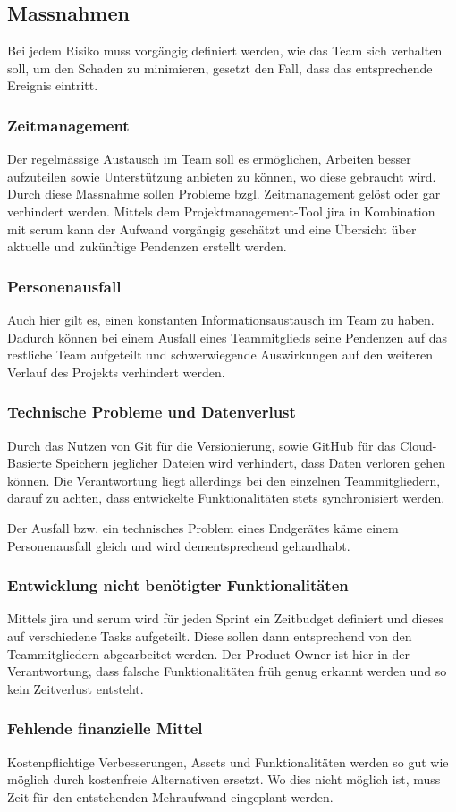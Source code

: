 \documentclass[../main.tex]{subfiles}
\begin{document}
	\subsection{Massnahmen}
	\par Bei jedem Risiko muss vorgängig definiert werden, wie das Team sich verhalten soll, um den Schaden zu minimieren, gesetzt den Fall, dass das entsprechende Ereignis eintritt.
	
	\subsubsection{Zeitmanagement}
	\par Der regelmässige Austausch im Team soll es ermöglichen, Arbeiten besser aufzuteilen sowie Unterstützung anbieten zu können, wo diese gebraucht wird. Durch diese Massnahme sollen Probleme bzgl. Zeitmanagement gelöst oder gar verhindert werden. Mittels dem Projektmanagement-Tool \gls{jira} in Kombination mit \gls{scrum} kann der Aufwand vorgängig geschätzt und eine Übersicht über aktuelle und zukünftige Pendenzen erstellt werden.
	
	\subsubsection{Personenausfall}
	\par Auch hier gilt es, einen konstanten Informationsaustausch im Team zu haben. Dadurch können bei einem Ausfall eines Teammitglieds seine Pendenzen auf das restliche Team aufgeteilt und schwerwiegende Auswirkungen auf den weiteren Verlauf des Projekts verhindert werden.
	
	\subsubsection{Technische Probleme und Datenverlust}
	\par Durch das Nutzen von Git für die Versionierung, sowie GitHub für das Cloud-Basierte Speichern jeglicher Dateien wird verhindert, dass Daten verloren gehen können. Die Verantwortung liegt allerdings bei den einzelnen Teammitgliedern, darauf zu achten, dass entwickelte Funktionalitäten stets synchronisiert werden. 
	\par Der Ausfall bzw. ein technisches Problem eines Endgerätes käme einem Personenausfall gleich und wird dementsprechend gehandhabt.
	
	\subsubsection{Entwicklung nicht benötigter Funktionalitäten}
	\par Mittels \gls{jira} und \gls{scrum} wird für jeden Sprint ein Zeitbudget definiert und dieses auf verschiedene Tasks aufgeteilt. Diese sollen dann entsprechend von den Teammitgliedern abgearbeitet werden.  Der Product Owner ist hier in der Verantwortung, dass falsche Funktionalitäten früh genug erkannt werden und so kein Zeitverlust entsteht.
	
	\subsubsection{Fehlende finanzielle Mittel}
	\par Kostenpflichtige Verbesserungen, Assets und Funktionalitäten werden so gut wie möglich durch kostenfreie Alternativen ersetzt. Wo dies nicht möglich ist, muss Zeit für den entstehenden Mehraufwand eingeplant werden.
\end{document}
